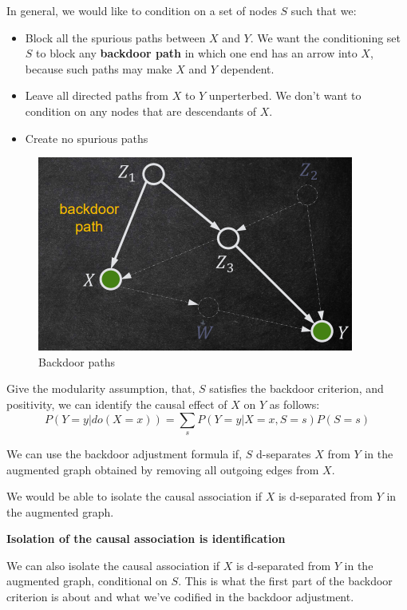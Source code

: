 In general, we would like to condition on a set of nodes $S$ such that we:
\begin{itemize}
      \item Block all the spurious paths between $X$ and $Y$. We want the
            conditioning set $S$ to block any \textbf{backdoor path} in which
            one end has an arrow into $X$, because such paths may make $X$ and
            $Y$ dependent.
      \item Leave all directed paths from $X$ to $Y$ unperterbed. We don't want
            to condition on any nodes that are descendants of $X$.
      \item Create no spurious paths
\end{itemize}
\begin{figure}[!ht]
      \centering
      \includegraphics[width=\textwidth]{img/backdoor.png}
      \caption{Backdoor paths}
      \label{fig:backdoor}
\end{figure}
\begin{definition}
      Give the modularity assumption, that, $S$ satisfies the backdoor criterion,
      and positivity, we can identify the causal effect of $X$ on $Y$ as follows:
      \begin{equation}
            P(Y = y| do(X = x)) = \sum_{s} P(Y = y| X = x, S = s)P(S = s)
      \end{equation}
\end{definition}
We can use the backdoor adjustment formula if, $S$ d-separates $X$ from $Y$ in
the augmented graph obtained by removing all outgoing edges from $X$. 

We would be able to isolate the causal association if $X$ is d-separated from 
$Y$ in the augmented graph.
\begin{center}
      \textbf{Isolation of the causal association is identification}
\end{center}

We can also isolate the causal association if $X$ is d-separated from $Y$ in
the augmented graph, conditional on $S$. This is what the first part of the 
backdoor criterion is about and what we've codified in the backdoor adjustment.